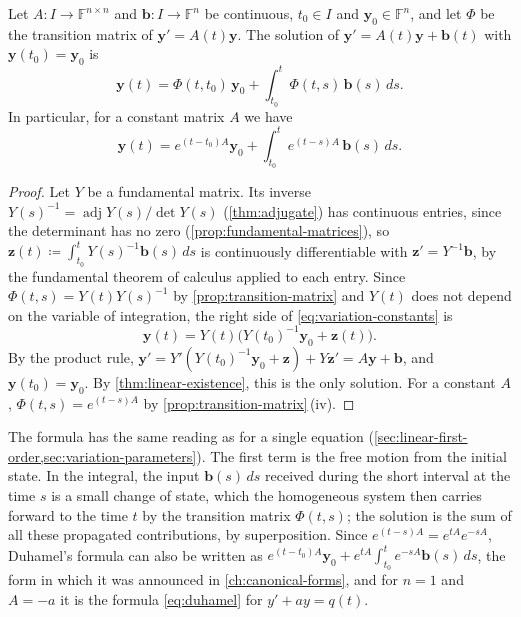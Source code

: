 \begin{theorem}
\label{thm:duhamel}
Let $A\colon I\to\mathbb F^{n\times n}$ and $\mathbf b\colon I\to\mathbb F^n$ be continuous, $t_0\in I$ and $\mathbf y_0\in\mathbb F^n$, and let $\Phi$ be the transition matrix of $\mathbf y'=A(t)\mathbf y$. The solution of $\mathbf y'=A(t)\mathbf y+\mathbf b(t)$ with $\mathbf y(t_0)=\mathbf y_0$ is
\begin{equation}
\mathbf y(t)=\Phi(t,t_0)\,\mathbf y_0+\int_{t_0}^t\Phi(t,s)\,\mathbf b(s)\,ds .
\label{eq:variation-constants}
\end{equation}
In particular, for a constant matrix $A$ we have 
\begin{equation}
\mathbf y(t)=e^{(t-t_0)A}\mathbf y_0+\int_{t_0}^te^{(t-s)A}\,\mathbf b(s)\,ds .
\label{eq:duhamel-system}
\end{equation}
\end{theorem}

\begin{proof}
Let $Y$ be a fundamental matrix. Its inverse $Y(s)^{-1}=\operatorname{adj}Y(s)/\det Y(s)$ (\cref{thm:adjugate}) has continuous entries, since the determinant has no zero (\cref{prop:fundamental-matrices}), so $\mathbf z(t)\coloneqq\int_{t_0}^tY(s)^{-1}\mathbf b(s)\,ds$ is continuously differentiable with $\mathbf z'=Y^{-1}\mathbf b$, by the fundamental theorem of calculus applied to each entry. Since $\Phi(t,s)=Y(t)Y(s)^{-1}$ by \cref{prop:transition-matrix} and $Y(t)$ does not depend on the variable of integration, the right side of \eqref{eq:variation-constants} is
\[
\mathbf y(t)=Y(t)\bigl(Y(t_0)^{-1}\mathbf y_0+\mathbf z(t)\bigr).
\]
By the product rule, $\mathbf y'=Y'(Y(t_0)^{-1}\mathbf y_0+\mathbf z)+Y\mathbf z'=A\mathbf y+\mathbf b$, and $\mathbf y(t_0)=\mathbf y_0$. By \cref{thm:linear-existence}, this is the only solution. For a constant $A$, $\Phi(t,s)=e^{(t-s)A}$ by \cref{prop:transition-matrix}\,(iv).
\end{proof}

The formula has the same reading as for a single equation (\cref{sec:linear-first-order,sec:variation-parameters}). The first term is the free motion from the initial state. In the integral, the input $\mathbf b(s)\,ds$ received during the short interval at the time $s$ is a small change of state, which the homogeneous system then carries forward to the time $t$ by the transition matrix $\Phi(t,s)$; the solution is the sum of all these propagated contributions, by superposition. Since $e^{(t-s)A}=e^{tA}e^{-sA}$, Duhamel's formula can also be written as $e^{(t-t_0)A}\mathbf y_0+e^{tA}\int_{t_0}^te^{-sA}\mathbf b(s)\,ds$, the form in which it was announced in \cref{ch:canonical-forms}, and for $n=1$ and $A=-a$ it is the formula \eqref{eq:duhamel} for $y'+ay=q(t)$.

